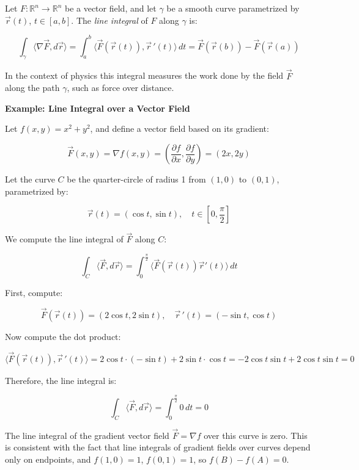 Let \( F : \mathbb{R}^n \to \mathbb{R}^n \) be a vector field, and let \( \gamma \) be a smooth curve parametrized by \( \vec{r}(t) \), \( t \in [a, b] \). 
The \emph{line integral} of \( F \) along \( \gamma \) is:

\[
\int_\gamma \langle \nabla \vec{F}, d\vec{r} \rangle = \int_a^b \langle \vec{F}(\vec{r}(t)), \vec{r}\,'(t) \rangle \, dt = \vec{F}(\vec{r}(b)) - \vec{F}(\vec{r}(a))
\]

In the context of physics this integral measures the work done by the field \( \vec{F} \) along the path \( \gamma \), such as force over distance.
\vspace{\baselineskip}

\textbf{Example: Line Integral over a Vector Field}
\vspace{\baselineskip}

Let \( f(x, y) = x^2 + y^2 \), and define a vector field based on its gradient:

\[
\vec{F}(x, y) = \nabla f(x, y) = \left( \frac{\partial f}{\partial x}, \frac{\partial f}{\partial y} \right) = (2x, 2y)
\]

Let the curve \( C \) be the quarter-circle of radius 1 from \( (1, 0) \) to \( (0, 1) \), 
parametrized by:

\[
\vec{r}(t) = (\cos t, \sin t), \quad t \in \left[0, \frac{\pi}{2}\right]
\]

We compute the line integral of \( \vec{F} \) along \( C \):

\[
\int_C \langle \vec{F}, d\vec{r}\rangle = \int_0^{\frac{\pi}{2}} \langle\vec{F}(\vec{r}(t)) \vec{r}'(t) \rangle\, dt
\]

First, compute:

\[
\vec{F}(\vec{r}(t)) = (2\cos t, 2\sin t), \quad \vec{r}\,'(t) = (-\sin t, \cos t)
\]

Now compute the dot product:

\[
\langle\vec{F}(\vec{r}(t)), \vec{r}\,'(t)\rangle = 2\cos t \cdot (-\sin t) + 2\sin t \cdot \cos t = -2\cos t \sin t + 2\cos t \sin t = 0
\]

Therefore, the line integral is:

\[
\int_C \langle \vec{F}, d\vec{r}\rangle = \int_0^{\frac{\pi}{2}} 0 \, dt = 0
\]

The line integral of the gradient vector field \( \vec{F} = \nabla f \) over this curve is zero. 
This is consistent with the fact that line integrals of gradient fields over 
curves depend only on endpoints, and  \(f(1,0) = 1 \), \(f(0,1) = 1 \), so \( f(B) - f(A) = 0 \).


